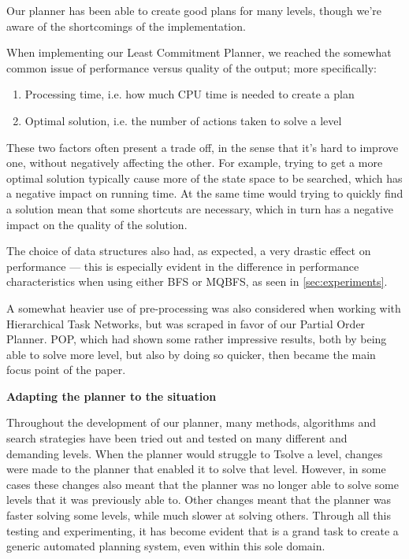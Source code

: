 \documentclass[Main]{subfiles}
\begin{document}
Our planner has been able to create good plans for many levels, though we're aware of the shortcomings of the implementation.




When implementing our Least Commitment Planner, we reached the somewhat common issue of performance versus quality of the output; more specifically:

\begin{enumerate}
	\item Processing time, i.e. how much CPU time is needed to create a plan
	\item Optimal solution, i.e. the number of actions taken to solve a level
\end{enumerate}

These two factors often present a trade off, in the sense that it's hard to improve one, without negatively affecting the other. 
For example, trying to get a more optimal solution typically cause more of the state space to be searched, which has a negative impact on running time.
At the same time would trying to quickly find a solution mean that some shortcuts are necessary, which in turn has a negative impact on the quality of the solution.

The choice of data structures also had, as expected, a very drastic effect on performance ---
this is especially evident in the difference in performance characteristics when using either BFS or MQBFS, as seen in \autoref{sec:experiments}.

A somewhat heavier use of pre-processing was also considered when working with Hierarchical Task Networks, but was scraped in favor of our Partial Order Planner. 
POP, which had shown some rather impressive results, both by being able to solve more level, but also by doing so quicker, then became the main focus point of the paper.


\textbf{Adapting the planner to the situation}

Throughout the development of our planner, many methods, algorithms and search strategies have been tried out and tested on many different and demanding levels. When the planner would struggle to Tsolve a level, changes were made to the planner that enabled it to solve that level. However, in some cases these changes also meant that the planner was no longer able to solve some levels that it was previously able to. Other changes meant that the planner was faster solving some levels, while much slower at solving others. Through all this testing and experimenting, it has become evident that is a grand task to create a generic automated planning system, even within this sole domain. 
\end{document}

